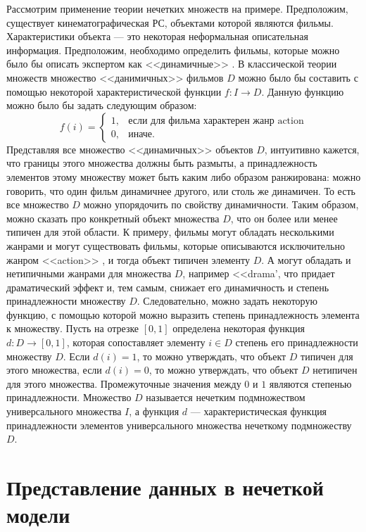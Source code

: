 Рассмотрим применение теории нечетких множеств на примере. Предположим,
существует кинематографическая РС,
объектами которой являются фильмы. Характеристики объекта ---
это некоторая неформальная описательная информация.
Предположим, необходимо определить фильмы, которые можно было бы
описать экспертом как <<динамичные>> . В классической
теории множеств множество <<данимичных>>  фильмов $D$ можно было бы составить с
помощью некоторой характеристической функции $f : I \rightarrow D$.
Данную функцию можно было бы задать следующим образом:
\begin{equation*}
  f(i) =
  \begin{cases}
    1, &\text{если для фильма характерен жанр action}\\
    0, &\text{иначе}.
  \end{cases}
\end{equation*}
Представляя все множество <<динамичных>>  объектов $D$, интуитивно
кажется, что границы этого множества должны быть размыты, а
принадлежность элементов этому множеству может быть каким либо образом
ранжирована: можно говорить,
что один фильм динамичнее другого, или столь же динамичен. То есть все
множество $D$ можно упорядочить по свойству динамичности.
Таким образом, можно сказать про конкретный объект множества $D$, что он более
или менее типичен для этой области. К примеру,
фильмы могут обладать несколькими жанрами и могут существовать фильмы, которые
описываются исключительно жанром <<action>> ,
и тогда объект типичен элементу $D$. А могут обладать и нетипичными
жанрами для множества $D$, например
<<drama\rq , что придает драматический эффект и, тем самым, снижает его
динамичность и степень принадлежности множеству $D$.
Следовательно, можно задать некоторую функцию, с помощью которой
можно выразить степень принадлежность элемента к множеству. Пусть
на отрезке $[0,1]$ определена некоторая функция
$d: D \rightarrow [0,1]$, которая сопоставляет элементу $i \in D$ степень
его принадлежности множеству $D$. Если $d(i) = 1$, то можно утверждать, что
объект $D$ типичен для этого множества, если $d(i) = 0$, то можно утверждать, что
объект $D$ нетипичен для этого множества. Промежуточные значения между
$0$ и $1$ являются степенью принадлежности.
Множество $D$ называется нечетким подмножеством универсального множества
$I$, а функция $d$ --- характеристическая функция
принадлежности элементов универсального множества нечеткому подмножеству $D$.

\section{Представление данных в нечеткой модели}
